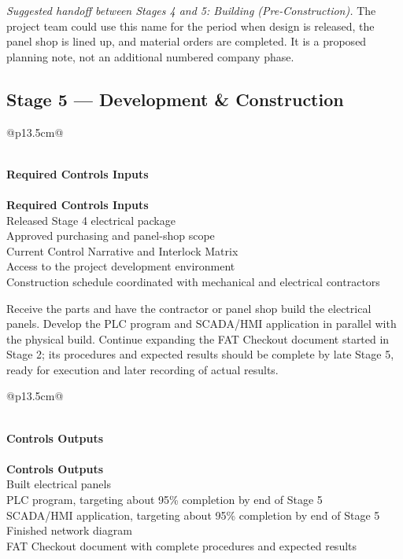 \noindent\textit{Suggested handoff between Stages 4 and 5: Building (Pre-Construction).} The project team could use this name for the period when design is released, the panel shop is lined up, and material orders are completed. It is a proposed planning note, not an additional numbered company phase.

\subsection{Stage 5 --- Development \& Construction}

\begin{longtable}{@{}p{13.5cm}@{}}
\caption{Stage 5 --- Required Controls Inputs}\label{tab:stage5-inputs} \\
\toprule
{}\textbf{Required Controls Inputs} \\
\midrule
\endfirsthead
{} \\
\toprule
{}\textbf{Required Controls Inputs} \\
\midrule
\endhead
Released Stage 4 electrical package \\
Approved purchasing and panel-shop scope \\
Current Control Narrative and Interlock Matrix \\
Access to the project development environment \\
Construction schedule coordinated with mechanical and electrical contractors \\
\bottomrule
\end{longtable}

Receive the parts and have the contractor or panel shop build the electrical panels. Develop the PLC program and SCADA/HMI application in parallel with the physical build. Continue expanding the FAT Checkout document started in Stage 2; its procedures and expected results should be complete by late Stage 5, ready for execution and later recording of actual results.

\begin{longtable}{@{}p{13.5cm}@{}}
\caption{Stage 5 --- Controls Outputs}\label{tab:stage5-outputs} \\
\toprule
{}\textbf{Controls Outputs} \\
\midrule
\endfirsthead
{} \\
\toprule
{}\textbf{Controls Outputs} \\
\midrule
\endhead
Built electrical panels \\
PLC program, targeting about 95\% completion by end of Stage 5 \\
SCADA/HMI application, targeting about 95\% completion by end of Stage 5 \\
Finished network diagram \\
FAT Checkout document with complete procedures and expected results \\
\bottomrule
\end{longtable}

